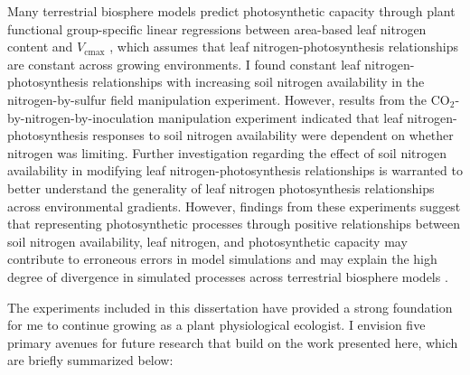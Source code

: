 Many terrestrial biosphere models predict photosynthetic capacity through plant functional group-specific linear regressions between area-based leaf nitrogen content and $V_\mathrm{cmax}$ , which assumes that leaf nitrogen-photosynthesis relationships are constant across growing environments. I found constant leaf nitrogen-photosynthesis relationships with increasing soil nitrogen availability in the nitrogen-by-sulfur field manipulation experiment. However, results from the CO$_2$-by-nitrogen-by-inoculation manipulation experiment indicated that leaf nitrogen-photosynthesis responses to soil nitrogen availability were dependent on whether nitrogen was limiting. Further investigation regarding the effect of soil nitrogen availability in modifying leaf nitrogen-photosynthesis relationships is warranted to better understand the generality of leaf nitrogen photosynthesis relationships across environmental gradients. However, findings from these experiments suggest that representing photosynthetic processes through positive relationships between soil nitrogen availability, leaf nitrogen, and photosynthetic capacity may contribute to erroneous errors in model simulations and may explain the high degree of divergence in simulated processes across terrestrial biosphere models .

The experiments included in this dissertation have provided a strong foundation for me to continue growing as a plant physiological ecologist. I envision five primary avenues for future research that build on the work presented here, which are briefly summarized below:

